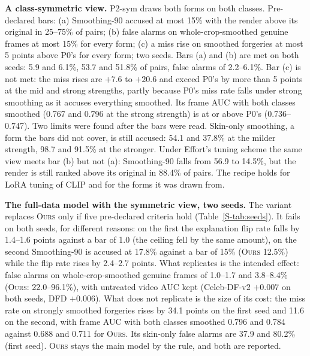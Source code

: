 \documentclass[conference]{IEEEtran}
\newcommand{\ours}{\textsc{Ours}}
\begin{document}
\textbf{A class-symmetric view.} P2-sym draws both forms on both classes. Pre-declared bars: (a) Smoothing-90 accused at most
15\% with the render above its original in 25--75\% of pairs; (b) false alarms on whole-crop-smoothed genuine frames at most 15\%
for every form; (c) a miss rise on smoothed forgeries at most 5 points above P0's for every form; two seeds. Bars (a) and (b) are
met on both seeds: 5.9 and 6.1\%, 53.7 and 51.8\% of pairs, false alarms of 2.2--6.1\%. Bar (c) is not met: the miss rises are
$+7.6$ to $+20.6$ and exceed P0's by more than 5 points at the mid and strong strengths, partly because P0's miss rate falls under
strong smoothing as it accuses everything smoothed. Its frame AUC with both classes smoothed (0.767 and 0.796 at the strong
strength) is at or above P0's (0.736--0.747). Two limits were found after the bars were read. Skin-only smoothing, a form the bars
did not cover, is still accused: 54.1 and 37.8\% at the milder strength, 98.7 and 91.5\% at the stronger. Under Effort's tuning
scheme the same view meets bar (b) but not (a): Smoothing-90 falls from 56.9 to 14.5\%, but the render is still ranked above its
original in 88.4\% of pairs. The recipe holds for LoRA tuning of CLIP and for the forms it was drawn from.

\textbf{The full-data model with the symmetric view, two seeds.} The variant replaces \ours{} only if five pre-declared criteria
hold (Table~\ref{S-tab:seeds}). It fails on both seeds, for different reasons: on the first the explanation flip rate falls by
1.4--1.6 points against a bar of 1.0 (the ceiling fell by the same amount), on the second Smoothing-90 is accused at 17.8\% against a
bar of 15\% (\ours{} 12.5\%) while the flip rate rises by 2.4--2.7 points. What replicates is the intended effect: false alarms on
whole-crop-smoothed genuine frames of 1.0--1.7 and 3.8--8.4\% (\ours{}: 22.0--96.1\%), with untreated video AUC kept (Celeb-DF-v2
$+0.007$ on both seeds, DFD $+0.006$). What does not replicate is the size of its cost: the miss rate on strongly smoothed forgeries
rises by 34.1 points on the first seed and 11.6 on the second, with frame AUC with both classes smoothed 0.796 and 0.784 against
0.688 and 0.711 for \ours{}. Its skin-only false alarms are 37.9 and 80.2\% (first seed). \ours{} stays the main model by the
rule, and both are reported.
\end{document}

